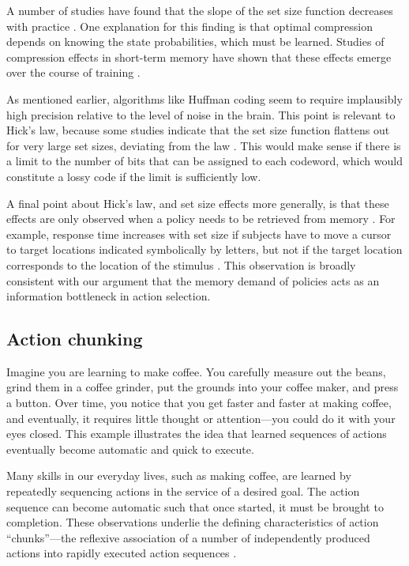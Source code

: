 \documentclass[11pt]{article}
\begin{document}
A number of studies have found that the slope of the set size function decreases with practice \citep{hale68,mowbray59,wifall16,teichner74}. One explanation for this finding is that optimal compression depends on knowing the state probabilities, which must be learned. Studies of compression effects in short-term memory have shown that these effects emerge over the course of training \citep{brady09,ngiam19}.

As mentioned earlier, algorithms like Huffman coding seem to require implausibly high precision relative to the level of noise in the brain. This point is relevant to Hick's law, because some studies indicate that the set size function flattens out for very large set sizes, deviating from the law \citep{seibel63,longstreth88}. This would make sense if there is a limit to the number of bits that can be assigned to each codeword, which would constitute a lossy code if the limit is sufficiently low.

A final point about Hick's law, and set size effects more generally, is that these effects are only observed when a policy needs to be retrieved from memory \citep{proctor18}. For example, response time increases with set size if subjects have to move a cursor to target locations indicated symbolically by letters, but not if the target location corresponds to the location of the stimulus \citep{dassonville99}. This observation is broadly consistent with our argument that the memory demand of policies acts as an information bottleneck in action selection.

\subsection{Action chunking}

Imagine you are learning to make coffee. You carefully measure out the beans, grind them in a coffee grinder, put the grounds into your coffee maker, and press a button. Over time, you notice that you get faster and faster at making coffee, and eventually, it requires little thought or attention---you could do it with your eyes closed. This example illustrates the idea that learned sequences of actions eventually become automatic and quick to execute.

Many skills in our everyday lives, such as making coffee, are learned by repeatedly sequencing actions in the service of a desired goal. The action sequence can become automatic such that once started, it must be brought to completion. These observations underlie the defining characteristics of action ``chunks''---the reflexive association of a number of independently produced actions into rapidly executed action sequences \citep{dezfouli12,lashley51,sakai03,botvinick08}.
\end{document}
